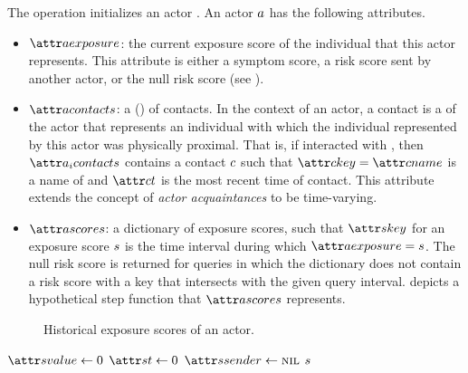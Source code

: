 The \cCreateActor{} operation initializes an actor \citep{Agha1985}. An actor $a$ has the following attributes.
\begin{itemize}
  \item $\aActorExposure$: the current exposure score of the individual that this actor represents. This attribute is either a symptom score, a risk score sent by another actor, or the null risk score (see \cNullRiskScore).
  \item $\aActorContacts$: a  () of contacts. In the context of an actor, a contact is a  \citep{Gamma1995} of the actor that represents an individual with which the individual represented by this actor was physically proximal. That is, if  interacted with , then $\aContacts{\vActor_i}$ contains a contact $c$ such that $\aContactKey = \aContactName$ is a name of  and $\aContactTime$ is the most recent time of contact. This attribute extends the concept of \emph{actor acquaintances} \citep{Hewitt1977a, Hewitt1977b, Agha1985} to be time-varying.
  \item $\aActorScores$: a dictionary of exposure scores, such that $\aScoreKey$ for an exposure score $s$ is the time interval during which $\aActorExposure = \vScore$. The null risk score is returned for queries in which the dictionary does not contain a risk score with a key that intersects with the given query interval.  depicts a hypothetical step function that $\aActorScores$ represents.
\end{itemize}

\begin{figure}[htb]
\centering
{}
\caption[Historical exposure scores of an actor]{Historical exposure scores of an actor.}
\label{fig:exposure}
\end{figure}

\begin{function}{\nNullRiskScore}
  \State $\aScoreValue \assign 0$
  \State $\aScoreTime \assign 0$
  \State $\aScoreSender \assign \nil$
  \State \Return $s$
\end{function}

